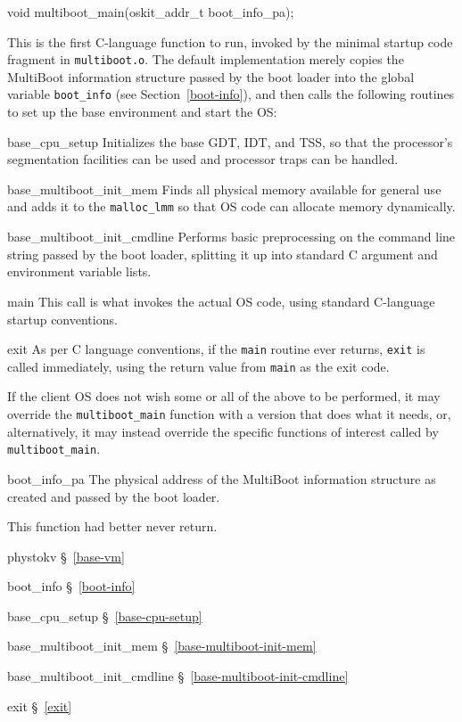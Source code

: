 \label{multiboot-main}
\begin{apisyn}

	\funcproto void multiboot_main(oskit_addr_t boot_info_pa);
\end{apisyn}
\begin{apidesc}
	This is the first C-language function to run,
	invoked by the minimal startup code fragment in {\tt multiboot.o}.
	The default implementation merely copies
	the MultiBoot information structure passed by the boot loader
	into the global variable {\tt boot_info}
	(see Section~\ref{boot-info}),
	and then calls the following routines
	to set up the base environment and start the OS:
	\begin{csymlist}
	\item[base_cpu_setup]
		Initializes the base GDT, IDT, and TSS,
		so that the processor's segmentation facilities can be used
		and processor traps can be handled.
	\item[base_multiboot_init_mem]
		Finds all physical memory available for general use
		and adds it to the {\tt malloc_lmm}
		so that OS code can allocate memory dynamically.
	\item[base_multiboot_init_cmdline]
		Performs basic preprocessing on the command line string
		passed by the boot loader,
		splitting it up into standard C argument
		and environment variable lists.
	\item[main]
		This call is what invokes the actual OS code,
		using standard C-language startup conventions.
	\item[exit]
		As per C language conventions,
		if the {\tt main} routine ever returns,
		{\tt exit} is called immediately,
		using the return value from {\tt main} as the exit code.
	\end{csymlist}
	If the client OS does not wish some or all of the above to be performed,
	it may override the {\tt multiboot_main} function
	with a version that does what it needs,
	or, alternatively, it may instead override
	the specific functions of interest called by {\tt multiboot_main}.
\end{apidesc}
\begin{apiparm}
	\item[boot_info_pa]
		The physical address of the MultiBoot information structure
		as created and passed by the boot loader.
\end{apiparm}
\begin{apiret}
	This function had better never return.
\end{apiret}
\begin{apidep}
	\item[phystokv]		\S~\ref{base-vm}
	\item[boot_info]	\S~\ref{boot-info}
	\item[base_cpu_setup]	\S~\ref{base-cpu-setup}
	\item[base_multiboot_init_mem]
				\S~\ref{base-multiboot-init-mem}
	\item[base_multiboot_init_cmdline]
				\S~\ref{base-multiboot-init-cmdline}
	\item[exit]
				\S~\ref{exit}
\end{apidep}

